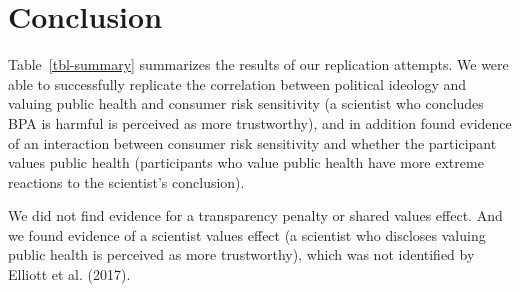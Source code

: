 \documentclass[
  letterpaper,
  DIV=11,
  numbers=noendperiod]{scrartcl}
\begin{document}
\hypertarget{conclusion}{%
\section{Conclusion}\label{conclusion}}

Table~\ref{tbl-summary} summarizes the results of our replication
attempts. We were able to successfully replicate the correlation between
political ideology and valuing public health and consumer risk
sensitivity (a scientist who concludes BPA is harmful is perceived as
more trustworthy), and in addition found evidence of an interaction
between consumer risk sensitivity and whether the participant values
public health (participants who value public health have more extreme
reactions to the scientist's conclusion).

We did not find evidence for a transparency penalty or shared values
effect. And we found evidence of a scientist values effect (a scientist
who discloses valuing public health is perceived as more trustworthy),
which was not identified by Elliott et al. (2017).
\end{document}
